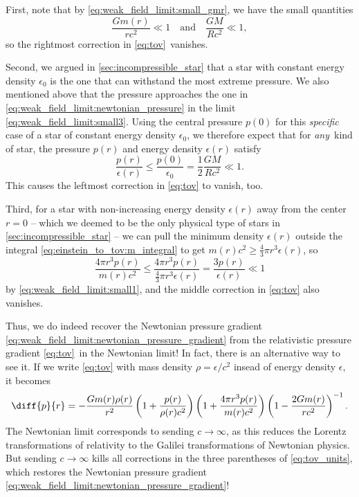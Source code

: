 First, note that by \cref{eq:weak_field_limit:small_gmr}, we have the small quantities
\begin{equation}
	\frac{Gm(r)}{rc^2} \ll 1
	\quad \text{and} \quad
	\frac{GM}{Rc^2} \ll 1 ,
	\label{eq:weak_field_limit:small3}
\end{equation}
so the rightmost correction in \cref{eq:tov} vanishes.

Second, we argued in \cref{sec:incompressible_star} that a star with constant energy density $\epsilon_0$ is the one that can withstand the most extreme pressure.
We also mentioned above that the pressure approaches the one in \cref{eq:weak_field_limit:newtonian_pressure} in the limit \eqref{eq:weak_field_limit:small3}.
Using the central pressure $p(0)$ for this \emph{specific} case of a star of constant energy density $\epsilon_0$, we therefore expect that for \emph{any} kind of star, the pressure $p(r)$ and energy density $\epsilon(r)$ satisfy
\begin{equation}
	\frac{p(r)}{\epsilon(r)} \leq \frac{p(0)}{\epsilon_0} = \frac{1}{2} \frac{GM}{Rc^2} \ll 1 .
	\label{eq:weak_field_limit:small1}
\end{equation}
This causes the leftmost correction in \cref{eq:tov} to vanish, too.

Third, for a star with non-increasing energy density $\epsilon(r)$ away from the center $r=0$ -- which we deemed to be the only physical type of stars in \cref{sec:incompressible_star} -- we can pull the minimum density $\epsilon(r)$ outside the integral \eqref{eq:einstein_to_tov:m_integral} to get $m(r) c^2 \geq \frac{4}{3} \pi r^3 \epsilon(r)$, so
\begin{equation*}
	\frac{4 \pi r^3 p(r)}{m(r) c^2} \leq \frac{4 \pi r^3 p(r)}{\frac{4}{3} \pi r^3 \epsilon(r)}
	                                =    \frac{3 p(r)}{\epsilon(r)}
						            \ll  1
\end{equation*}
by \cref{eq:weak_field_limit:small1}, and the middle correction in \cref{eq:tov} also vanishes.

Thus, we do indeed recover the Newtonian pressure gradient \eqref{eq:weak_field_limit:newtonian_pressure_gradient} from the relativistic pressure gradient \eqref{eq:tov} in the Newtonian limit!
In fact, there is an alternative way to see it.
If we write \cref{eq:tov} with mass density $\rho = \epsilon/c^2$ insead of energy density $\epsilon$, it becomes
\begin{equation}
	\diff{p}{r} = -\frac{G m(r) \rho(r)}{r^2} \left( 1 + \frac{p(r)}{\rho(r) c^2} \right) \left( 1 + \frac{4 \pi r^3 p(r)}{m(r) c^2} \right) \left( 1 - \frac{2 G m(r)}{r c^2} \right)^{-1} .
	\label{eq:tov_units}
\end{equation}
The Newtonian limit corresponds to sending $c \rightarrow \infty$, as this reduces the Lorentz transformations of relativity to the Galilei transformations of Newtonian physics.
But sending $c \rightarrow \infty$ kills all corrections in the three parentheses of \cref{eq:tov_units}, which restores the Newtonian pressure gradient \eqref{eq:weak_field_limit:newtonian_pressure_gradient}!
